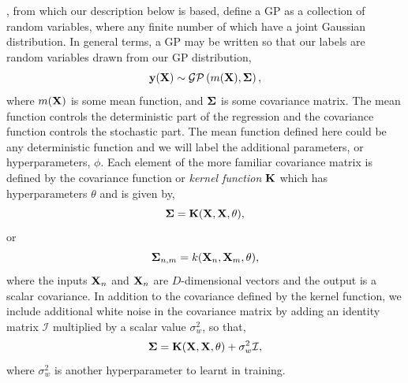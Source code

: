 \citet{williams1996gaussian}, from which our description below is based,  define a GP as a collection of random variables, where any finite number of which have a joint Gaussian distribution.  In general terms,  a GP may be written so that our labels are random variables drawn from our GP distribution, 
\begin{equation}
{\bf y}({\bf X}) \sim \mathcal{GP}\left( m({\bf X}),  {\bf \Sigma}\right),
\end{equation}
where $m({\bf X})$ is some mean function, and $\bf \Sigma$ is some covariance matrix.  The mean function controls the deterministic part of the regression and the covariance function controls the stochastic part.  The mean function defined here could be any deterministic function and we will label the additional parameters, or hyperparameters, $\phi$.  Each element of the more familiar covariance matrix is defined by the covariance function or {\it kernel function} $\bf K$ which has hyperparameters $\theta$ and is given by,
\begin{equation}
{\bf \Sigma} = {\bf K}({\bf X}, {\bf X},  \theta),
\end{equation}
or 
\begin{equation}
{\bf \Sigma}_{n, m} = k({\bf X}_{n}, {\bf X}_{m},  \theta),
\end{equation}
where the inputs ${\bf X}_{n}$ and ${\bf X}_{n}$ are $D$-dimensional vectors and the output is a scalar covariance.
In addition to the covariance defined by the kernel function, we include additional white noise in the covariance matrix by adding an identity matrix $\mathcal{I}$ multiplied by a scalar value $\sigma_{w}^2$, so that, 
\begin{equation}
{\bf \Sigma} = {\bf K}({\bf X}, {\bf X},  \theta) + \sigma_{w}^{2} \mathcal{I},
\end{equation}
where $\sigma_{w}^2$ is another hyperparameter to learnt in training. 

